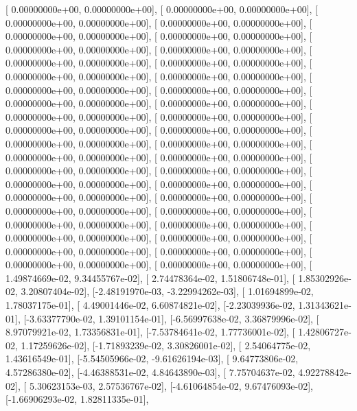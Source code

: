\documentclass{article}
\begin{document}
       [ 0.00000000e+00,  0.00000000e+00],
       [ 0.00000000e+00,  0.00000000e+00],
       [ 0.00000000e+00,  0.00000000e+00],
       [ 0.00000000e+00,  0.00000000e+00],
       [ 0.00000000e+00,  0.00000000e+00],
       [ 0.00000000e+00,  0.00000000e+00],
       [ 0.00000000e+00,  0.00000000e+00],
       [ 0.00000000e+00,  0.00000000e+00],
       [ 0.00000000e+00,  0.00000000e+00],
       [ 0.00000000e+00,  0.00000000e+00],
       [ 0.00000000e+00,  0.00000000e+00],
       [ 0.00000000e+00,  0.00000000e+00],
       [ 0.00000000e+00,  0.00000000e+00],
       [ 0.00000000e+00,  0.00000000e+00],
       [ 0.00000000e+00,  0.00000000e+00],
       [ 0.00000000e+00,  0.00000000e+00],
       [ 0.00000000e+00,  0.00000000e+00],
       [ 0.00000000e+00,  0.00000000e+00],
       [ 0.00000000e+00,  0.00000000e+00],
       [ 0.00000000e+00,  0.00000000e+00],
       [ 0.00000000e+00,  0.00000000e+00],
       [ 0.00000000e+00,  0.00000000e+00],
       [ 0.00000000e+00,  0.00000000e+00],
       [ 0.00000000e+00,  0.00000000e+00],
       [ 0.00000000e+00,  0.00000000e+00],
       [ 0.00000000e+00,  0.00000000e+00],
       [ 0.00000000e+00,  0.00000000e+00],
       [ 0.00000000e+00,  0.00000000e+00],
       [ 0.00000000e+00,  0.00000000e+00],
       [ 0.00000000e+00,  0.00000000e+00],
       [ 0.00000000e+00,  0.00000000e+00],
       [ 0.00000000e+00,  0.00000000e+00],
       [ 0.00000000e+00,  0.00000000e+00],
       [ 0.00000000e+00,  0.00000000e+00],
       [ 0.00000000e+00,  0.00000000e+00],
       [ 0.00000000e+00,  0.00000000e+00],
       [ 0.00000000e+00,  0.00000000e+00],
       [ 0.00000000e+00,  0.00000000e+00],
       [ 0.00000000e+00,  0.00000000e+00],
       [ 0.00000000e+00,  0.00000000e+00],
       [ 1.49874669e-02,  9.34455767e-02],
       [ 2.74478364e-02,  1.51806748e-01],
       [ 1.85302926e-02,  3.20807404e-02],
       [-2.48191970e-03, -3.22994262e-03],
       [ 1.01694899e-02,  1.78037175e-01],
       [ 4.49001446e-02,  6.60874821e-02],
       [-2.23039936e-02,  1.31343621e-01],
       [-3.63377790e-02,  1.39101154e-01],
       [-6.56997638e-02,  3.36879996e-02],
       [ 8.97079921e-02,  1.73356831e-01],
       [-7.53784641e-02,  1.77736001e-02],
       [ 1.42806727e-02,  1.17259626e-02],
       [-1.71893239e-02,  3.30826001e-02],
       [ 2.54064775e-02,  1.43616549e-01],
       [-5.54505966e-02, -9.61626194e-03],
       [ 9.64773806e-02,  4.57286380e-02],
       [-4.46388531e-02,  4.84643890e-03],
       [ 7.75704637e-02,  4.92278842e-02],
       [ 5.30623153e-03,  2.57536767e-02],
       [-4.61064854e-02,  9.67476093e-02],
       [-1.66906293e-02,  1.82811335e-01],
\end{document}
